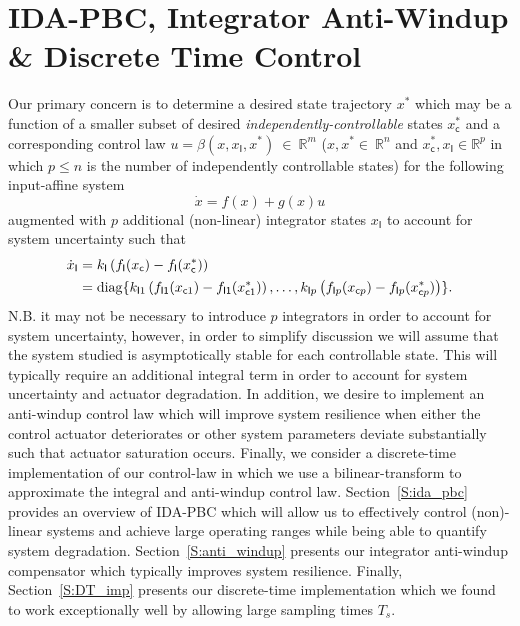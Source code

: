\section{IDA-PBC, Integrator Anti-Windup \& Discrete Time Control}
\label{S:control}%
Our primary concern is to determine a desired state trajectory $x^*$
which may be a function of a smaller subset of desired {\em
  independently-controllable} states $x_{\mathsf{c}}^*$ and a corresponding
control law $u=\beta(x,x_{\mathsf{I}},x^*)\ \in\ \mathbb{R}^m$ ($x,x^* \in\
\mathbb{R}^n$ and $x_{\mathsf{c}}^*, x_{\mathsf{I}} \in
\mathbb{R}^{p}$ in which $p \leq n$ is the number of
independently controllable states) for the following input-affine system 
\begin{equation}
\label{E:ias}
\dot{x} = f(x) + g(x)u 
\end{equation}
augmented with $p$ additional (non-linear) integrator
states $x_{\mathsf{I}}$ to account for system uncertainty such that 
\begin{align*}
\dot{x}_{\mathsf{I}} &= k_{\mathsf{I}}\left ( f_{\mathsf{I}} (x_{\mathsf{c}}) -
  f_{\mathsf{I}} (x_{\mathsf{c}}^*) \right )\\
&= \operatorname{diag} \{
k_{\mathsf{I}1}\left ( f_{\mathsf{I1}} (x_{\mathsf{c}1}) -
  f_{\mathsf{I1}} (x_{\mathsf{c}1}^*) \right ),\dots,k_{\mathsf{I}p}\left ( f_{\mathsf{I}p} (x_{\mathsf{c}p}) -
  f_{\mathsf{I}p} (x_{\mathsf{c}p}^*) \right )\}.
\end{align*}
N.B. it may not be necessary to introduce $p$ integrators in order to
account for system uncertainty, however, in order to simplify
discussion we will assume that the system studied is asymptotically
stable for each controllable state.  This will typically require an
additional integral term in order to account for system uncertainty
and actuator degradation.  In addition, we desire to implement an
anti-windup control law which will improve system resilience when
either the control actuator deteriorates or other system parameters
deviate substantially such that actuator saturation occurs.  Finally,
we consider a discrete-time implementation of our control-law in which
we use a bilinear-transform to approximate the integral and
anti-windup control law.  Section~\ref{S:ida_pbc} provides an overview
of IDA-PBC which will allow us to effectively control (non)-linear
systems and achieve large operating ranges while being able to
quantify system degradation. Section~\ref{S:anti_windup} presents our
integrator anti-windup compensator which typically improves system
resilience.  Finally, Section~\ref{S:DT_imp} presents our
discrete-time implementation which we found to work exceptionally well
by allowing large sampling times $T_s$.
